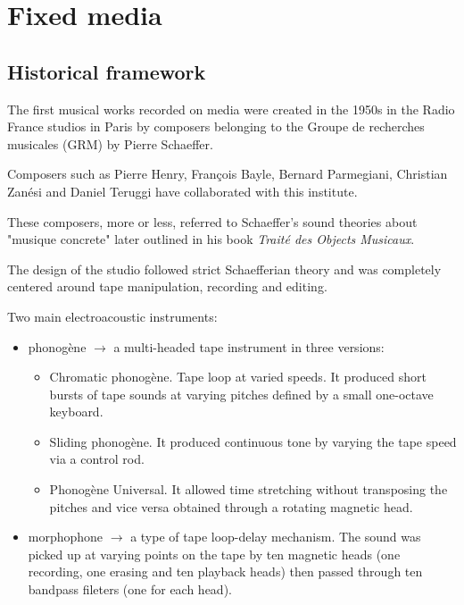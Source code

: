 \chapter{Fixed media}

\section{Historical framework}\label{historical-framework}

The first musical works recorded on media were created in the 1950s in the Radio France studios in Paris by composers belonging to the Groupe de recherches musicales (GRM) by Pierre Schaeffer.

Composers such as Pierre Henry, François Bayle, Bernard Parmegiani, Christian Zanési and Daniel Teruggi have collaborated with this institute.

These composers, more or less, referred to Schaeffer’s sound theories about "musique concrete" later outlined in his book  \textit{Traité des Objects Musicaux}.

The design of the studio followed strict Schaefferian theory and was completely centered around tape manipulation, recording and editing.

Two main electroacoustic instruments:

\begin{itemize}
\tightlist
\item phonogène \(\rightarrow\) a multi-headed tape instrument in three versions:
    \begin{itemize}
    \tightlist
    \item Chromatic phonogène. Tape loop at varied speeds. It produced short bursts of tape sounds at varying pitches defined by a small one-octave keyboard.
    \item Sliding phonogène. It produced continuous tone by varying the tape speed via a control rod.
    \item Phonogène Universal. It allowed time stretching without transposing the pitches and vice versa obtained through a rotating magnetic head.
    \end{itemize}
\item morphophone \(\rightarrow\)  a type of tape loop-delay mechanism. The sound was picked up at varying points on the tape by ten magnetic heads (one recording, one erasing and ten playback heads) then passed through ten bandpass fileters (one for each head).
\end{itemize}

